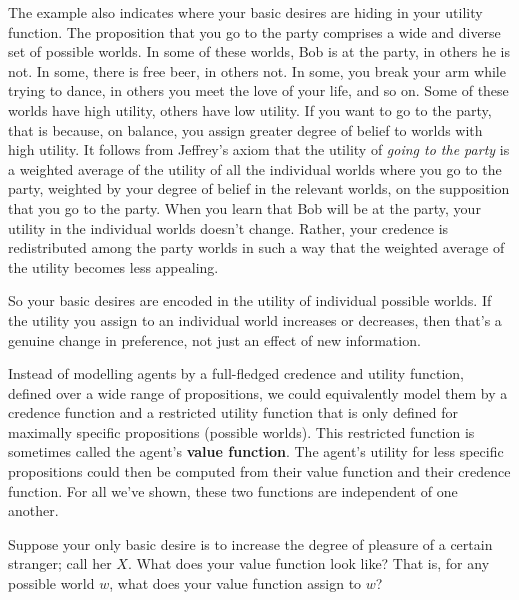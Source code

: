The example also indicates where your basic desires are hiding in your
utility function. The proposition that you go to the party comprises a
wide and diverse set of possible worlds. In some of these worlds, Bob
is at the party, in others he is not. In some, there is free beer, in
others not. In some, you break your arm while trying to dance, in
others you meet the love of your life, and so on. Some of these worlds have high
utility, others have low utility. If you want to go to the party, that
is because, on balance, you assign greater degree of belief to worlds
with high utility. It follows from Jeffrey's axiom that the utility of
\emph{going to the party} is a weighted average of the utility of all
the individual worlds where you go to the party, weighted by your
degree of belief in the relevant worlds, on the supposition that you
go to the party. When you learn that Bob will be at the party, your
utility in the individual worlds doesn't change. Rather, your credence
is redistributed among the party worlds in such a way that the
weighted average of the utility becomes less appealing.

So your basic desires are encoded in the utility of individual
possible worlds. If the utility you assign to an individual world
increases or decreases, then that's a genuine change in preference,
not just an effect of new information.

Instead of modelling agents by a full-fledged credence and utility
function, defined over a wide range of propositions, we could
equivalently model them by a credence function and a restricted
utility function that is only defined for maximally specific
propositions (possible worlds). This restricted function is
sometimes called the agent's \textbf{value function}. The agent's
utility for less specific propositions could then be computed from
their value function and their credence function. For all we've shown,
these two functions are independent of one another.

\begin{exercise}
  Suppose your only basic desire is to increase the degree of pleasure
  of a certain stranger; call her $X$. What does your value function
  look like? That is, for any possible world $w$, what does your value
  function assign to $w$?  

\end{exercise}


